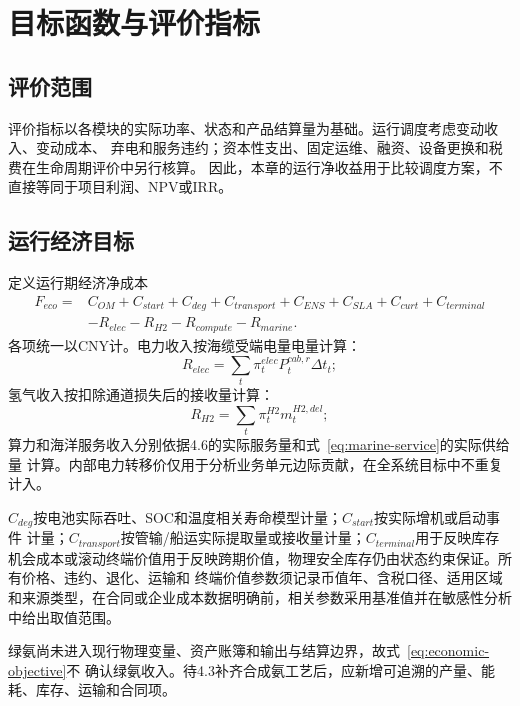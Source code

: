 \section{目标函数与评价指标}
\label{sec:objective}

\subsection{评价范围}

评价指标以各模块的实际功率、状态和产品结算量为基础。运行调度考虑变动收入、变动成本、
弃电和服务违约；资本性支出、固定运维、融资、设备更换和税费在生命周期评价中另行核算。
因此，本章的运行净收益用于比较调度方案，不直接等同于项目利润、NPV或IRR。

\subsection{运行经济目标}

定义运行期经济净成本
\begin{equation}
\begin{aligned}
F_{eco}={}&C_{OM}+C_{start}+C_{deg}+C_{transport}
+C_{ENS}+C_{SLA}+C_{curt}+C_{terminal}\\
&-R_{elec}-R_{H2}-R_{compute}-R_{marine}.
\end{aligned}
\label{eq:economic-objective}
\end{equation}
各项统一以CNY计。电力收入按海缆受端电量电量计算：
\begin{equation}
R_{elec}=\sum_t\pi_t^{elec}P_t^{cab,r}\Delta t_t;
\label{eq:revenue-electricity}
\end{equation}
氢气收入按扣除通道损失后的接收量计算：
\begin{equation}
R_{H2}=\sum_t\pi_t^{H2}m_t^{H2,del};
\label{eq:revenue-hydrogen}
\end{equation}
算力和海洋服务收入分别依据4.6的实际服务量和式~\eqref{eq:marine-service}的实际供给量
计算。内部电力转移价仅用于分析业务单元边际贡献，在全系统目标中不重复计入。

$C_{deg}$按电池实际吞吐、SOC和温度相关寿命模型计量；$C_{start}$按实际增机或启动事件
计量；$C_{transport}$按管输/船运实际提取量或接收量计量；$C_{terminal}$用于反映库存
机会成本或滚动终端价值用于反映跨期价值，物理安全库存仍由状态约束保证。所有价格、违约、退化、运输和
终端价值参数须记录币值年、含税口径、适用区域和来源类型，在合同或企业成本数据明确前，相关参数采用基准值并在敏感性分析中给出取值范围。

绿氨尚未进入现行物理变量、资产账簿和输出与结算边界，故式~\eqref{eq:economic-objective}不
确认绿氨收入。待4.3补齐合成氨工艺后，应新增可追溯的产量、能耗、库存、运输和合同项。

